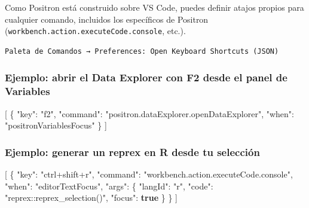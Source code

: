 \documentclass[
  doc,
  floatsintext,
  longtable,
  a4paper,
  nolmodern,
  notxfonts,
  notimes,
  12pt,
  colorlinks=true,linkcolor=blue,citecolor=blue,urlcolor=blue]{apa7}
\newenvironment{Shaded}{\begin{snugshade}}{\end{snugshade}}
\newcommand{\DataTypeTok}[1]{\textcolor[rgb]{0.68,0.00,0.00}{#1}}
\newcommand{\FunctionTok}[1]{\textcolor[rgb]{0.28,0.35,0.67}{#1}}
\newcommand{\KeywordTok}[1]{\textcolor[rgb]{0.00,0.23,0.31}{\textbf{#1}}}
\newcommand{\OtherTok}[1]{\textcolor[rgb]{0.00,0.23,0.31}{#1}}
\newcommand{\StringTok}[1]{\textcolor[rgb]{0.13,0.47,0.30}{#1}}
\begin{document}
Como Positron está construido sobre VS Code, puedes definir atajos
propios para cualquier comando, incluidos los específicos de Positron
(\texttt{workbench.action.executeCode.console}, etc.).

\begin{verbatim}
Paleta de Comandos → Preferences: Open Keyboard Shortcuts (JSON)
\end{verbatim}

\subsubsection{Ejemplo: abrir el Data Explorer con F2 desde el panel de
Variables}\label{ejemplo-abrir-el-data-explorer-con-f2-desde-el-panel-de-variables}

\begin{Shaded}
\begin{Highlighting}[]
\OtherTok{[}
  \FunctionTok{\{}
    \DataTypeTok{"key"}\FunctionTok{:} \StringTok{"f2"}\FunctionTok{,}
    \DataTypeTok{"command"}\FunctionTok{:} \StringTok{"positron.dataExplorer.openDataExplorer"}\FunctionTok{,}
    \DataTypeTok{"when"}\FunctionTok{:} \StringTok{"positronVariablesFocus"}
  \FunctionTok{\}}
\OtherTok{]}
\end{Highlighting}
\end{Shaded}

\subsubsection{Ejemplo: generar un reprex en R desde tu
selección}\label{ejemplo-generar-un-reprex-en-r-desde-tu-selecciuxf3n}

\begin{Shaded}
\begin{Highlighting}[]
\OtherTok{[}
  \FunctionTok{\{}
    \DataTypeTok{"key"}\FunctionTok{:} \StringTok{"ctrl+shift+r"}\FunctionTok{,}
    \DataTypeTok{"command"}\FunctionTok{:} \StringTok{"workbench.action.executeCode.console"}\FunctionTok{,}
    \DataTypeTok{"when"}\FunctionTok{:} \StringTok{"editorTextFocus"}\FunctionTok{,}
    \DataTypeTok{"args"}\FunctionTok{:} \FunctionTok{\{}
      \DataTypeTok{"langId"}\FunctionTok{:} \StringTok{"r"}\FunctionTok{,}
      \DataTypeTok{"code"}\FunctionTok{:} \StringTok{"reprex::reprex\_selection()"}\FunctionTok{,}
      \DataTypeTok{"focus"}\FunctionTok{:} \KeywordTok{true}
    \FunctionTok{\}}
  \FunctionTok{\}}
\OtherTok{]}
\end{Highlighting}
\end{Shaded}
\end{document}
